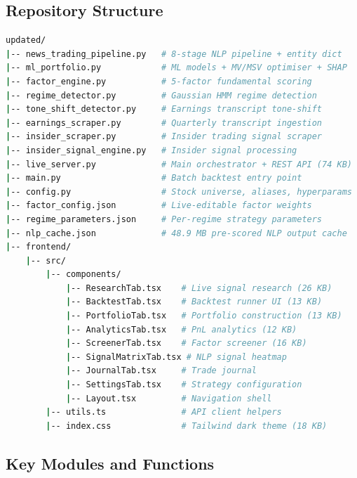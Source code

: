 \documentclass[12pt, a4paper]{article}
\begin{document}
\subsection{Repository Structure}

\begin{lstlisting}[language=bash, caption={Project directory structure}]
updated/
|-- news_trading_pipeline.py   # 8-stage NLP pipeline + entity dict
|-- ml_portfolio.py            # ML models + MV/MSV optimiser + SHAP
|-- factor_engine.py           # 5-factor fundamental scoring
|-- regime_detector.py         # Gaussian HMM regime detection
|-- tone_shift_detector.py     # Earnings transcript tone-shift
|-- earnings_scraper.py        # Quarterly transcript ingestion
|-- insider_scraper.py         # Insider trading signal scraper
|-- insider_signal_engine.py   # Insider signal processing
|-- live_server.py             # Main orchestrator + REST API (74 KB)
|-- main.py                    # Batch backtest entry point
|-- config.py                  # Stock universe, aliases, hyperparams
|-- factor_config.json         # Live-editable factor weights
|-- regime_parameters.json     # Per-regime strategy parameters
|-- nlp_cache.json             # 48.9 MB pre-scored NLP output cache
|-- frontend/
    |-- src/
        |-- components/
            |-- ResearchTab.tsx    # Live signal research (26 KB)
            |-- BacktestTab.tsx    # Backtest runner UI (13 KB)
            |-- PortfolioTab.tsx   # Portfolio construction (13 KB)
            |-- AnalyticsTab.tsx   # PnL analytics (12 KB)
            |-- ScreenerTab.tsx    # Factor screener (16 KB)
            |-- SignalMatrixTab.tsx # NLP signal heatmap
            |-- JournalTab.tsx     # Trade journal
            |-- SettingsTab.tsx    # Strategy configuration
            |-- Layout.tsx         # Navigation shell
        |-- utils.ts               # API client helpers
        |-- index.css              # Tailwind dark theme (18 KB)
\end{lstlisting}

\subsection{Key Modules and Functions}
\end{document}
